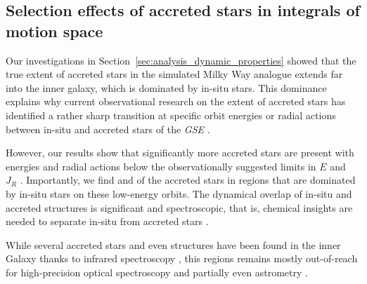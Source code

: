 \documentclass[fleqn,usenatbib]{mnras}
\begin{document}
\subsection{Selection effects of accreted stars in integrals of motion space} \label{sec:discussion_finding_accreted_stars}

Our investigations in Section~\ref{sec:analysis_dynamic_properties} showed that the true extent of accreted stars in the simulated Milky Way analogue extends far into the inner galaxy, which is dominated by in-situ stars. This dominance explains why current observational research on the extent of accreted stars has identified a rather sharp transition at specific orbit energies or radial actions between in-situ and accreted stars of the \textit{GSE} \citep{Helmi2018, Feuillet2021, Monty2024}.

However, our results show that significantly more accreted stars are present with energies and radial actions below the observationally suggested limits in $E$ \citep{Helmi2018, Monty2024} and $J_R$ \citep{Feuillet2020, Feuillet2021}. Importantly, we find  and  of the accreted stars in regions that are dominated by in-situ stars on these low-energy orbits. The dynamical overlap of in-situ and accreted structures is significant and spectroscopic, that is, chemical insights are needed to separate in-situ from accreted stars \citep[for example][]{Das2020, Horta2021, Sestito2021, Buder2022}.

While several accreted stars and even structures have been found in the inner Galaxy thanks to infrared spectroscopy \citep[for example][]{Horta2021}, this regions remains mostly out-of-reach for high-precision optical spectroscopy and partially even astrometry \citep{Queiroz2023}.
\end{document}
